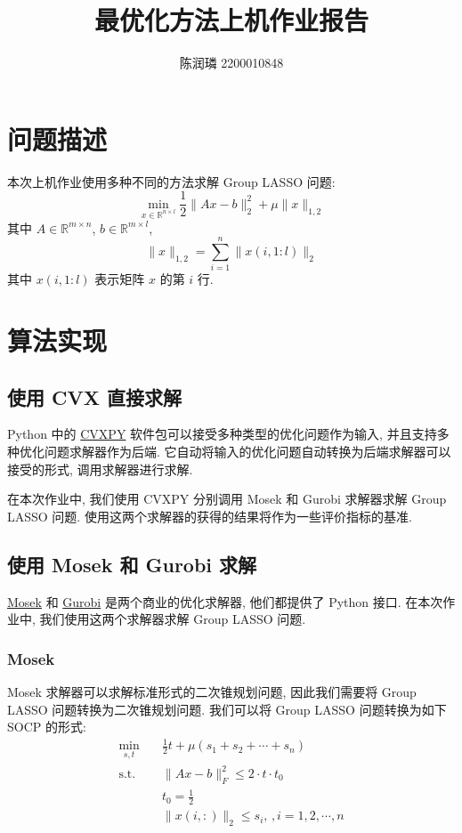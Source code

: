 \documentclass{article}
\title{最优化方法上机作业报告}
\author{陈润璘 2200010848}
\begin{document}
\maketitle

\section{问题描述}

本次上机作业使用多种不同的方法求解 Group LASSO 问题:
\begin{equation*}
    \min_{x \in \mathbb{R}^{n\times l}} \frac{1}{2} \|Ax - b\|_2^2 +
    \mu \|x\|_{1,2}
\end{equation*}
其中 $A \in \mathbb{R}^{m\times n}$, $b \in \mathbb{R}^{m\times l}$,
\begin{equation*}
    \|x\|_{1,2} = \sum_{i=1}^n \|x(i, 1:l)\|_2
\end{equation*}
其中 $x(i, 1:l)$ 表示矩阵 $x$ 的第 $i$ 行.

\section{算法实现}

\subsection{使用 CVX 直接求解}

Python 中的 \href{https://www.cvxpy.org/}{CVXPY} 软件包可以接受多种类型的优化问题作为输入, 并且支持多种优化问题求解器作为后端. 它自动将输入的优化问题自动转换为后端求解器可以接受的形式, 调用求解器进行求解.

在本次作业中, 我们使用 CVXPY 分别调用 Mosek 和 Gurobi 求解器求解 Group LASSO 问题. 使用这两个求解器的获得的结果将作为一些评价指标的基准.

\subsection{使用 Mosek 和 Gurobi 求解}

\href{https://www.mosek.com/}{Mosek} 和 \href{https://www.gurobi.com/}{Gurobi} 是两个商业的优化求解器, 他们都提供了 Python 接口. 在本次作业中, 我们使用这两个求解器求解 Group LASSO 问题.

\subsubsection{Mosek}

Mosek 求解器可以求解标准形式的二次锥规划问题, 因此我们需要将 Group LASSO 问题转换为二次锥规划问题. 我们可以将 Group LASSO 问题转换为如下 SOCP 的形式:
\begin{equation*}
    \begin{aligned}
        \min_{s,t}\quad & \frac{1}{2} t + \mu (s_1 + s_2 + \cdots + s_n)\\
        \text{s.t.}\quad & \|Ax - b\|_F^2 \le 2 \cdot t \cdot t_0\\
        &t_0 = \frac{1}{2}\\
        &\|x(i, :)\|_2 \le s_i,\,, i = 1, 2, \cdots, n
    \end{aligned}
\end{equation*}
\end{document}

